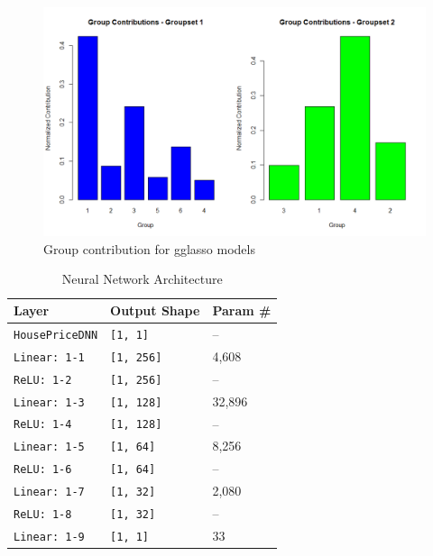 \documentclass[a4paper, 11pt]{article}
\begin{document}
\begin{figure}[H]
\includegraphics[scale=0.5]{gglassocontrib}
\centering
\caption{Group contribution for gglasso models}
\label{fig:gglassocontrib}
\end{figure}


\begin{table}[H]
\centering
\begin{tabular}{|l|l|l|}
\hline
\textbf{Layer} & \textbf{Output Shape} & \textbf{Param \#} \\ \hline
\texttt{HousePriceDNN} & \texttt{[1, 1]} & -- \\ \hline
\texttt{Linear: 1-1} & \texttt{[1, 256]} & 4,608 \\ \hline
\texttt{ReLU: 1-2} & \texttt{[1, 256]} & -- \\ \hline
\texttt{Linear: 1-3} & \texttt{[1, 128]} & 32,896 \\ \hline
\texttt{ReLU: 1-4} & \texttt{[1, 128]} & -- \\ \hline
\texttt{Linear: 1-5} & \texttt{[1, 64]} & 8,256 \\ \hline
\texttt{ReLU: 1-6} & \texttt{[1, 64]} & -- \\ \hline
\texttt{Linear: 1-7} & \texttt{[1, 32]} & 2,080 \\ \hline
\texttt{ReLU: 1-8} & \texttt{[1, 32]} & -- \\ \hline
\texttt{Linear: 1-9} & \texttt{[1, 1]} & 33 \\ \hline
\end{tabular}
\caption{Neural Network Architecture}
\label{tab:NN}
\end{table}
\end{document}
